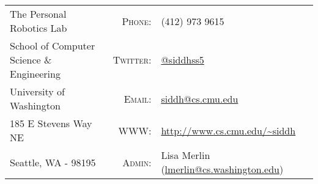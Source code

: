 
\begin{center}
\begin{tabular}{lrl}
The Personal Robotics Lab & \textsc{Phone:} & (412) 973 9615 \\
School of Computer Science \& Engineering& \textsc{Twitter:} & \href{https://twitter.com/siddhss5}{@siddhss5} \\
University of Washington& \textsc{Email:} & \url{siddh@cs.cmu.edu}\\
185 E Stevens Way NE&  \textsc{WWW:} & \url{http://www.cs.cmu.edu/~siddh}\\
Seattle, WA - 98195 & \textsc{Admin:} & Lisa Merlin (\url{lmerlin@cs.washington.edu})
\end{tabular}
\end{center}
